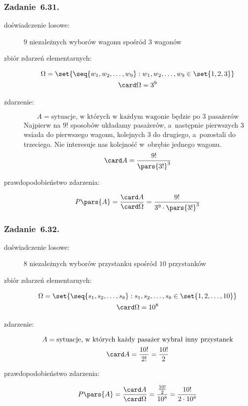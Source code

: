 \subsubsection*{Zadanie~6.31.}
\begin{description}
    \item[doświadczenie losowe:] \(9\) niezależnych wyborów wagonu spośród \(3\) wagonów
    \item[zbiór zdarzeń elementarnych:]
        \begin{gather*}
            \Omega = \set{\seq{w_1, w_2, \ldots, w_9} : w_1, w_2, \ldots, w_9 \in \set{1, 2, 3}}\\
            \card\Omega = 3^9
        \end{gather*}
    \item[zdarzenie:]
        \begin{equation*}
            A = \text{sytuacje, w~których w~każdym wagonie będzie po \(3\) pasażerów}
        \end{equation*}
        Najpierw na \(9!\) sposobów układamy pasażerów, a~następnie pierwszych \(3\) wsiada do pierwszego wagonu, kolejnych \(3\) do drugiego, a~pozostali do trzeciego. Nie interesuje nas kolejność w~obrębie jednego wagonu.
        \begin{equation*}
            \card A = \frac{9!}{\pars{3!}^3}
        \end{equation*}
    \item[prawdopodobieństwo zdarzenia:]
        \begin{equation*}
            P\pars{A}
                = \frac{\card A}{\card\Omega}
                = \frac{9!}{3^9 \cdot \pars{3!}^3}
        \end{equation*}
\end{description}
\subsubsection*{Zadanie~6.32.}
\begin{description}
    \item[doświadczenie losowe:] \(8\) niezależnych wyborów przystanku spośród \(10\) przystanków
    \item[zbiór zdarzeń elementarnych:]
        \begin{gather*}
            \Omega = \set{\seq{s_1, s_2, \ldots, s_8} : s_1, s_2, \ldots, s_8 \in \set{1, 2, \ldots, 10}}\\
            \card\Omega = 10^8
        \end{gather*}
    \item[zdarzenie:]
        \begin{gather*}
            A = \text{sytuacje, w~których każdy pasażer wybrał inny przystanek}\\
            \card A = \frac{10!}{2!} = \frac{10!}{2}
        \end{gather*}
    \item[prawdopodobieństwo zdarzenia:]
        \begin{equation*}
            P\pars{A}
                = \frac{\card A}{\card\Omega}
                = \frac{\frac{10!}{2}}{10^8}
                = \frac{10!}{2 \cdot 10^8}
        \end{equation*}
\end{description}
